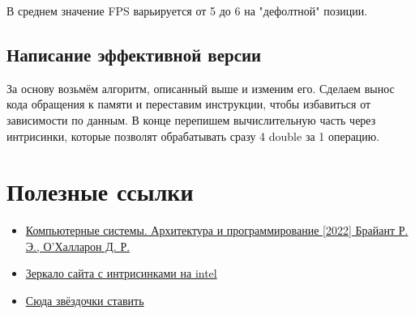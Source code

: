 \documentclass[12pt,a4paper]{article}
\begin{document}
В среднем значение FPS варьируется от 5 до 6 на "дефолтной" позиции.

\subsection{Написание эффективной версии}

За основу возьмём алгоритм, описанный выше и изменим его. Сделаем вынос кода обращения к памяти и переставим инструкции, чтобы избавиться от зависимости по данным. В конце перепишем вычислительную часть через интрисинки, которые позволят обрабатывать сразу 4 double за 1 операцию.







\section{Полезные ссылки}

\begin{itemize}
    \item \href{https://vk.com/wall-51126445_124413}{Компьютерные системы. Архитектура и программирование [2022] Брайант Р. Э., О'Халларон Д. Р.}
    \item \href{https://www.laruence.com/sse/#techs=MMX,SSE,SSE2,SSE3,SSSE3,SSE4_1,SSE4_2,AVX,AVX2&expand=4974,4923,3865,3869,3870,736&text=mul}{Зеркало сайта с интрисинками на intel}
    \item \href{https://github.com/kzueirf12345/mandelbrat2}{Сюда звёздочки ставить}
\end{itemize}
\end{document}
